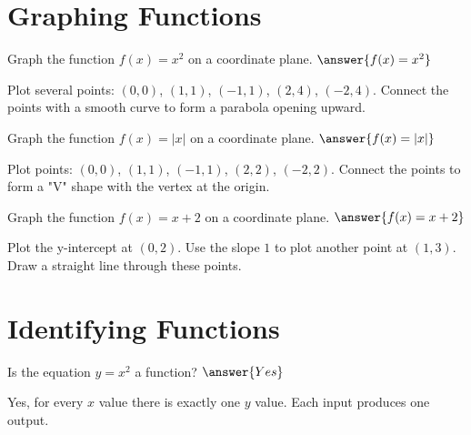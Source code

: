 \documentclass{ximera}
\begin{document}


\section*{Graphing Functions}

\begin{problem}
Graph the function $f(x) = x^2$ on a coordinate plane. $\answer{f(x) = x^2}$
\begin{feedback}
Plot several points: $(0, 0)$, $(1, 1)$, $(-1, 1)$, $(2, 4)$, $(-2, 4)$. Connect the points with a smooth curve to form a parabola opening upward.
\end{feedback}
\end{problem}

\begin{problem}
Graph the function $f(x) = |x|$ on a coordinate plane. $\answer{f(x) = |x|}$
\begin{feedback}
Plot points: $(0, 0)$, $(1, 1)$, $(-1, 1)$, $(2, 2)$, $(-2, 2)$. Connect the points to form a "V" shape with the vertex at the origin.
\end{feedback}
\end{problem}

\begin{problem}
Graph the function $f(x) = x + 2$ on a coordinate plane. $\answer{f(x) = x + 2}$
\begin{feedback}
Plot the y-intercept at $(0, 2)$. Use the slope $1$ to plot another point at $(1, 3)$. Draw a straight line through these points.
\end{feedback}
\end{problem}



\section*{Identifying Functions}

\begin{problem}
Is the equation $y = x^2$ a function? $\answer{Yes}$
\begin{feedback}
Yes, for every $x$ value there is exactly one $y$ value. Each input produces one output.
\end{feedback}
\end{problem}
\end{document}

